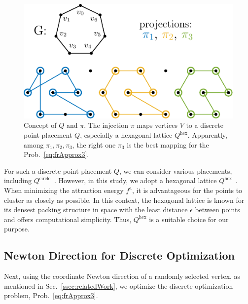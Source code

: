 \documentclass[dvipdfmx,10pt,journal,compsoc]{IEEEtran}
\begin{document}
\begin{figure}[t]
  \centering
  \includegraphics[width=\columnwidth]{pi/pi.pdf}
  \caption{
    Concept of $Q$ and $\pi$.
    The injection $\pi$ maps vertices $V$ to a discrete point placement $Q$, especially a hexagonal lattice $Q^\mathrm{hex}$.
    Apparently, among $\pi_1, \pi_2, \pi_3$, the right one $\pi_3$ is the best mapping for the Prob.~\eqref{eq:frApprox3}.
  }
  \label{fig:pi}
\end{figure}

For such a discrete point placement $Q$, we can consider various placements, including $Q^\mathrm{circle}$~\cite{ghassemitoosiSimulatedAnnealingPreProcessing2016}.
However, in this study, we adopt a hexagonal lattice $Q^\mathrm{hex}$~\cite{patelHexagonalGrids2013,s22145179}.
When minimizing the attraction energy $f^\mathrm{a}$, it is advantageous for the points to cluster as closely as possible. In this context, the hexagonal lattice is known for its densest packing structure in space with the least distance $\epsilon$ between points and offers computational simplicity. Thus, $Q^\mathrm{hex}$ is a suitable choice for our purpose.

\subsection{Newton Direction for Discrete Optimization}\label{ssec:newtonDirection}

Next, using the coordinate Newton direction of a randomly selected vertex, as mentioned in Sec.~\ref{ssec:relatedWork}, we optimize the discrete optimization problem, Prob.~\eqref{eq:frApprox3}.
\end{document}
